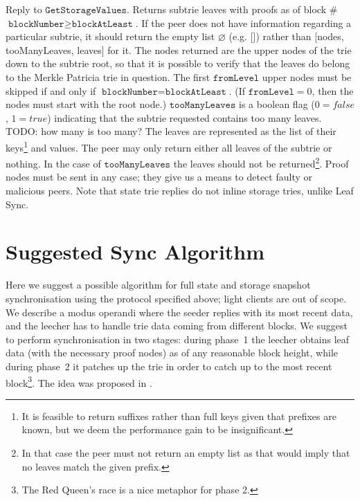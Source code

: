 \documentclass{amsart}
\begin{document}
Reply to $\texttt{GetStorageValues}$.
Returns subtrie leaves with proofs as of block \#$\texttt{blockNumber} \geq \texttt{blockAtLeast}$.
If the peer does not have information regarding a particular subtrie, it should return the empty list $\varnothing$ (e.g. []) rather than [nodes, tooManyLeaves, leaves] for it.
The nodes returned are the upper nodes of the trie down to the subtrie root, so that it is possible to verify that the leaves do belong to the Merkle Patricia trie in question.
The first $\texttt{fromLevel}$ upper nodes must be skipped if and only if $\texttt{blockNumber} = \texttt{blockAtLeast}$.
(If $\texttt{fromLevel} = 0$, then the nodes must start with the root node.)
$\texttt{tooManyLeaves}$ is a boolean flag ($0=false$, $1=true$) indicating that the subtrie requested contains too many leaves.
TODO: how many is too many?
The leaves are represented as the list of their keys\footnote{It
is feasible to return suffixes rather than full keys given that prefixes are known, but we deem the performance gain to be insignificant.}
and values.
The peer may only return either all leaves of the subtrie or nothing.
In the case of $\texttt{tooManyLeaves}$ the leaves should not be returned\footnote{In
that case the peer must not return an empty list as that would imply that no leaves match the given prefix.}.
Proof nodes must be sent in any case;
they give us a means to detect faulty or malicious peers.
Note that state trie replies do not inline storage tries, unlike Leaf Sync.

\section{Suggested Sync Algorithm}

Here we suggest a possible algorithm for full state and storage snapshot synchronisation using the protocol specified above;
light clients are out of scope.
We describe a modus operandi where the seeder replies with its most recent data,
and the leecher has to handle trie data coming from different blocks.
We suggest to perform synchronisation in two stages:
during phase~1 the leecher obtains leaf data (with the necessary proof nodes) as of any reasonable block height,
while during phase~2 it patches up the trie in order to catch up to the most recent block\footnote{The
Red Queen's race is a nice metaphor for phase 2.}.
The idea was proposed in \cite{leaf_sync}.
\end{document}
